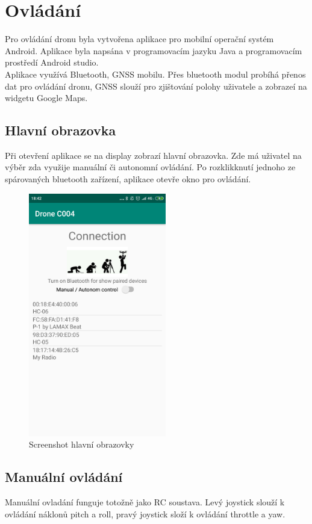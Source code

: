\chapter{Ovládání}
\label{7-aplikace}
Pro ovládání dronu byla vytvořena aplikace pro mobilní operační systém Android. Aplikace byla napsána v programovacím jazyku Java a programovacím prostředí Android studio.\\

Aplikace využívá Bluetooth, GNSS mobilu. Přes bluetooth modul probíhá přenos dat pro ovládání dronu, GNSS slouží pro zjištování polohy uživatele a zobrazeí na widgetu Google Maps.\\

\section{Hlavní obrazovka}
Při otevření aplikace se na display zobrazí hlavní obrazovka. Zde má uživatel na výběr zda využije manuální či autonomní ovládání. Po rozklikknutí jednoho ze spárovaných bluetooth zařízení, aplikace otevře okno pro ovládání.\\
\begin{figure}[h]
	\centering
	\includegraphics[width=6cm]{pictures/app1.png}
	\caption{Screenshot hlavní obrazovky}
\end{figure}

\section{Manuální ovládání} 
Manuální ovladání funguje totožně jako RC soustava. Levý joystick slouží k ovládání náklonů pitch a roll, pravý joystick složí k ovládání throttle a yaw. 

